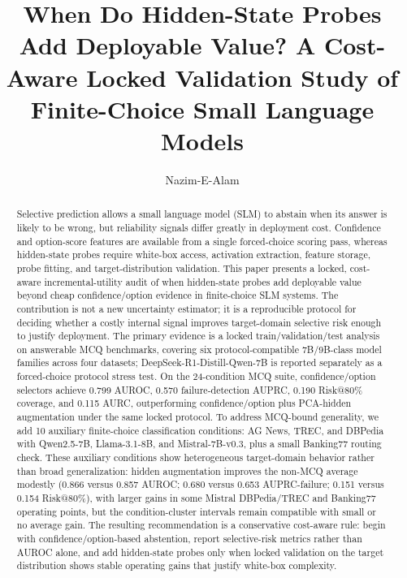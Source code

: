 \documentclass[preprint,12pt,authoryear]{elsarticle}
\begin{document}
\begin{frontmatter}

\title{When Do Hidden-State Probes Add Deployable Value? A Cost-Aware Locked Validation Study of Finite-Choice Small Language Models}

\author[aff1]{Nazim-E-Alam}



\begin{abstract}
Selective prediction allows a small language model (SLM) to abstain when its answer is likely to be wrong, but reliability signals differ greatly in deployment cost. Confidence and option-score features are available from a single forced-choice scoring pass, whereas hidden-state probes require white-box access, activation extraction, feature storage, probe fitting, and target-distribution validation. This paper presents a locked, cost-aware incremental-utility audit of when hidden-state probes add deployable value beyond cheap confidence/option evidence in finite-choice SLM systems. The contribution is not a new uncertainty estimator; it is a reproducible protocol for deciding whether a costly internal signal improves target-domain selective risk enough to justify deployment. The primary evidence is a locked train/validation/test analysis on answerable MCQ benchmarks, covering six protocol-compatible 7B/9B-class model families across four datasets; DeepSeek-R1-Distill-Qwen-7B is reported separately as a forced-choice protocol stress test. On the 24-condition MCQ suite, confidence/option selectors achieve 0.799 AUROC, 0.570 failure-detection AUPRC, 0.190 Risk@80\% coverage, and 0.115 AURC, outperforming confidence/option plus PCA-hidden augmentation under the same locked protocol. To address MCQ-bound generality, we add 10 auxiliary finite-choice classification conditions: AG News, TREC, and DBPedia with Qwen2.5-7B, Llama-3.1-8B, and Mistral-7B-v0.3, plus a small Banking77 routing check. These auxiliary conditions show heterogeneous target-domain behavior rather than broad generalization: hidden augmentation improves the non-MCQ average modestly (0.866 versus 0.857 AUROC; 0.680 versus 0.653 AUPRC-failure; 0.151 versus 0.154 Risk@80\%), with larger gains in some Mistral DBPedia/TREC and Banking77 operating points, but the condition-cluster intervals remain compatible with small or no average gain. The resulting recommendation is a conservative cost-aware rule: begin with confidence/option-based abstention, report selective-risk metrics rather than AUROC alone, and add hidden-state probes only when locked validation on the target distribution shows stable operating gains that justify white-box complexity.
\end{abstract}




\end{frontmatter}
\end{document}
